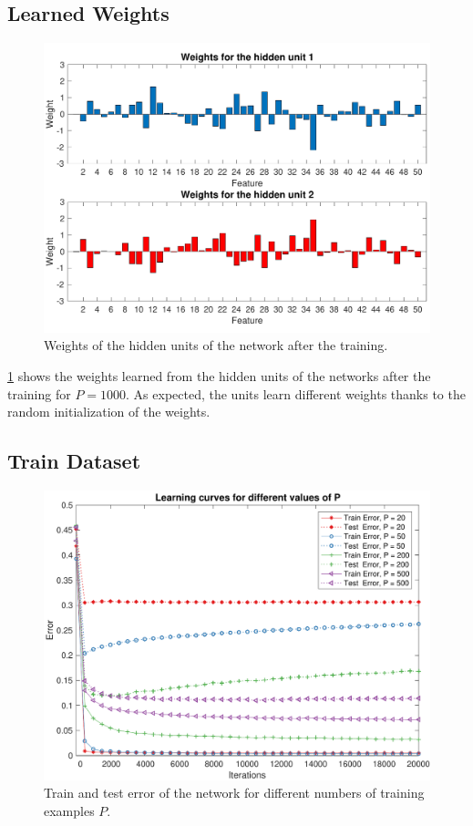 \subsection{Learned Weights}
\begin{figure}[t]
	\centering
	\includegraphics[width=\columnwidth]{figures/weights_p_1000}
    \caption{Weights of the hidden units of the network after the training.}
	\label{fig:weights}
\end{figure}

\cref{fig:weights} shows the weights learned from the hidden units of the networks after the training for $P = 1000$.
As expected, the units learn different weights thanks to the random initialization of the weights.

\subsection{Train Dataset}
\begin{figure}[t]
	\centering
	\includegraphics[width=\columnwidth]{figures/error_ps}
    \caption{Train and test error of the network for different numbers of training examples $P$.}
	\label{fig:ps}
\end{figure}

